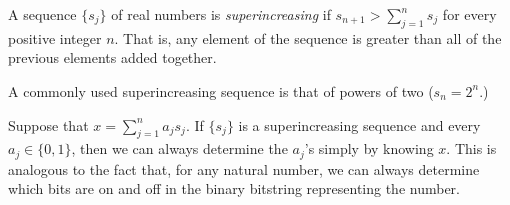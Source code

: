 \documentclass[12pt]{article}
\begin{document}
A sequence $\{s_j\}$ of real numbers is \emph{superincreasing} if $\displaystyle s_{n+1} > \sum_{j=1}^n s_j$ for every positive integer $n$.  That is, any element of the sequence is greater than all of the previous elements added together.

A commonly used superincreasing sequence is that of powers of two ($s_n = 2^n$.)

Suppose that $\displaystyle x=\sum_{j=1}^n a_j s_j$.  If $\{s_j\}$ is a superincreasing sequence and every $a_j \in \{0,1\}$, then we can always determine the $a_j$'s simply by knowing $x$.  This is analogous to the fact that, for any natural number, we can always determine which bits are on and off in the binary bitstring representing the number.
\end{document}
